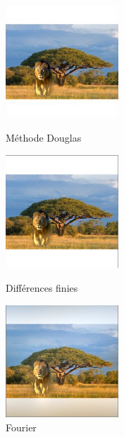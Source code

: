 \documentclass{article}
\begin{document}
\begin{figure}[!htb]
   \begin{minipage}{0.33\textwidth}
     \centering
     \includegraphics[width = 120pt]{Annexe/LionD.png}
     \caption{Méthode Douglas}
      \end{minipage}\hfill
   \begin{minipage}{0.33\textwidth}
     \centering
     \includegraphics[width = 120pt]{Annexe/LionDF.png}
     \caption{Différences finies}
      \end{minipage}\hfill
   \begin{minipage}{0.33\textwidth}
     \centering
     \includegraphics[width= 120pt]{Annexe/LF.png}
     \caption{Fourier}
   \end{minipage}
\end{figure}
\end{document}
